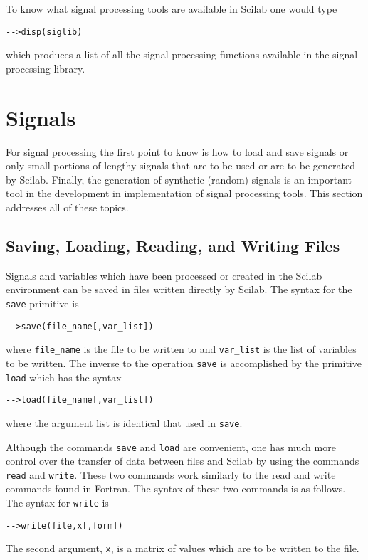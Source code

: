     To know what signal processing tools
are available in Scilab one would type
\begin{verbatim}
-->disp(siglib)
\end{verbatim}
which produces a list of all the signal processing functions available
in the signal processing library.  

\section{Signals}

	For signal processing the first point to know is how to load and 
save signals or  only small portions of lengthy signals that are to be
used or are to be generated by Scilab.  Finally, the generation of
synthetic (random) signals is an important tool in the development
in implementation of signal processing tools.  This section addresses
all of these topics.

\subsection{Saving, Loading, Reading, and Writing Files}

	Signals and variables which have been processed or created
in the Scilab environment can be saved in files written directly
by Scilab.  The syntax for the {\tt save} primitive is 
\begin{verbatim}
-->save(file_name[,var_list])
\end{verbatim}
where {\tt file\_name} is the file to be written to and {\tt var\_list}
is the list of variables to be written.
  The inverse to the
operation {\tt save} is accomplished by the primitive {\tt load}
which has the syntax
\begin{verbatim}
-->load(file_name[,var_list])
\end{verbatim}
where the argument list is identical that used in {\tt save}.

	Although the commands {\tt save} and {\tt load} are
convenient, one has much more control over the transfer of
data between files and Scilab by using the commands {\tt read}
and {\tt write}.  These two commands work similarly to the
read and write commands found in Fortran.  The syntax of these
two commands is as follows.  The syntax for {\tt write} is
\begin{verbatim}
-->write(file,x[,form])
\end{verbatim}
  The second argument, {\tt x}, is a matrix of values which are to be 
written to the file.

